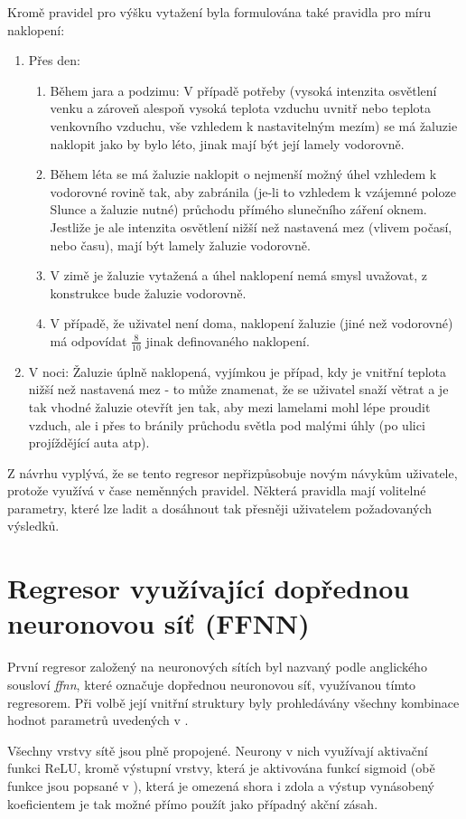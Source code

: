         Kromě pravidel pro výšku vytažení byla formulována také pravidla pro míru naklopení:
        \begin{enumerate}
            \item Přes den:
            \begin{enumerate}
                \item Během jara a podzimu: V případě potřeby (vysoká intenzita osvětlení venku a zároveň alespoň vysoká teplota vzduchu uvnitř nebo teplota venkovního vzduchu, vše vzhledem k nastavitelným mezím) se má žaluzie naklopit jako by bylo léto, jinak mají být její lamely vodorovně.
                \item Během léta se má žaluzie naklopit o nejmenší možný úhel vzhledem k vodorovné rovině tak, aby zabránila (je-li to vzhledem k vzájemné poloze Slunce a žaluzie nutné) průchodu přímého slunečního záření oknem. Jestliže je ale intenzita osvětlení nižší než nastavená mez (vlivem počasí, nebo času), mají být lamely žaluzie vodorovně.
                \item V zimě je žaluzie vytažená a úhel naklopení nemá smysl uvažovat, z konstrukce bude žaluzie vodorovně.
                \item V případě, že uživatel není doma, naklopení žaluzie (jiné než vodorovné) má odpovídat $\frac{8}{10}$ jinak definovaného naklopení.
            \end{enumerate}
            \item V noci: Žaluzie úplně naklopená, vyjímkou je případ, kdy je vnitřní teplota nižší než nastavená mez - to může znamenat, že se uživatel snaží větrat a je tak vhodné žaluzie otevřít jen tak, aby mezi lamelami mohl lépe proudit vzduch, ale i přes to bránily průchodu světla pod malými úhly (po ulici projíždějící auta \acrshort{atp}).
        \end{enumerate}

        Z návrhu vyplývá, že se tento regresor nepřizpůsobuje novým návykům uživatele, protože využívá v čase neměnných pravidel. Některá pravidla mají volitelné parametry, které lze ladit a dosáhnout tak přesněji uživatelem požadovaných výsledků. 
    \section{Regresor využívající dopřednou neuronovou síť (FFNN)} \label{sec:ffnn}
        První regresor založený na neuronových sítích byl nazvaný  podle anglického sousloví \emph{\acrlong{ffnn}}, které označuje dopřednou neuronovou síť, využívanou tímto regresorem. Při volbě její vnitřní struktury byly prohledávány všechny kombinace hodnot parametrů uvedených v .
        
        Všechny vrstvy sítě jsou plně propojené. Neurony v nich využívají aktivační funkci ReLU, kromě výstupní vrstvy, která je aktivována funkcí sigmoid (obě funkce jsou popsané v ), která je omezená shora i zdola a výstup vynásobený koeficientem je tak možné přímo použít jako případný akční zásah.
